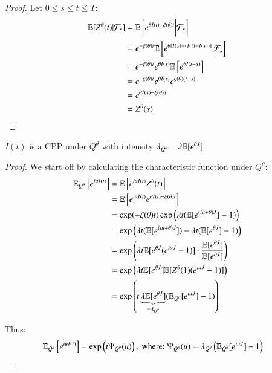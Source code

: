 \begin{proof}
Let $0 \leq s \leq t \leq T$: 
\begin{align*}
\mathbb{E}[Z^{\theta}(t)|\mathcal{F}_{s}] &= 
\mathbb{E}\left[
e^{\theta I(t) - \xi(\theta)t}
\bigg{|}\mathcal{F}_{s}\right] \\ 
&= 
e^{-\xi(\theta)t}\mathbb{E}\left[
e^{\theta[I(s) + (I(t)-I(s))]}
\bigg{|}\mathcal{F}_{s}\right] \\ 
&= 
e^{-\xi(\theta)t}e^{\theta I(s)}\mathbb{E}\left[
e^{\theta I(t-s)}
\right] \\ 
&= 
e^{-\xi(\theta)t}e^{\theta I(s)}e^{\xi(\theta)(t-s)} \\ 
&= e^{\theta I(s) - \xi(\theta)s} \\ 
&= Z^{\theta}(s)
\end{align*}
\end{proof}

\newpage 

\begin{proposition}
\label{prop: Esscher_transform_CPP_Q}
$I(t)$ is a CPP under $Q^{\theta}$ with intensity $\lambda_{Q^{\theta}} = \lambda \mathbb{E}[e^{\theta J}]$
\end{proposition} 

\begin{proof}
We start off by calculating the characteristic function under $Q^{\theta}$: 
\begin{align*}
\mathbb{E}_{Q^{\theta}}\left[
e^{iuI(t)} 
\right]
&= 
\mathbb{E}\left[
e^{iuI(t)}Z^{\theta}(t)
\right] \\ 
&= 
\mathbb{E}\left[
e^{iuI(t)}e^{\theta I(t) - \xi(\theta)t}
\right] \\ 
&= 
\exp(-\xi(\theta)t)\exp\left(
\lambda t(\mathbb{E}[e^{(iu+\theta)J}]-1)
\right) \\ 
&= 
\exp\left(
\lambda t(\mathbb{E}[e^{(iu+\theta)J}]) -
\lambda t(\mathbb{E}[e^{\theta J}]-1)
\right) \\ 
&= 
\exp\left(
\lambda t\mathbb{E}[e^{\theta J}(e^{iuJ}-1)]\cdot \frac{\mathbb{E}[e^{\theta J}]}{\mathbb{E}[e^{\theta J}]}
\right) \\ 
&= 
\exp\left(
\lambda t \mathbb{E}[e^{\theta J}]\mathbb{E}[Z^{\theta}(1)(e^{iuJ}-1)]
\right) \\ 
&= 
\exp\left(
t \underbrace{\lambda \mathbb{E}[e^{\theta J}]}_{= \lambda_{Q^{\theta}}}
(\mathbb{E}_{Q^{\theta}}[e^{iuJ}]-1)
\right)
\end{align*}

Thus: 
\begin{align*}
\mathbb{E}_{Q^{\theta}}\left[
e^{iuI(t)}
\right]
&= \exp\left(
t \Psi_{Q^{\theta}}(u)
\right), \;\text{where:}\;
\Psi_{Q^{\theta}}(u) = \lambda_{Q^{\theta}}\left(
\mathbb{E}_{Q^{\theta}}[e^{iuJ}]-1
\right)
\end{align*}
\end{proof}

